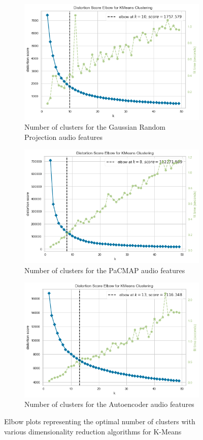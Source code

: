 \begin{figure}[!hbt]
\begin{subfigure}{.5\textwidth}
  \label{fig:sub-third}
\end{subfigure}
\begin{subfigure}{.5\textwidth}
  \centering
  \includegraphics[width=.6\linewidth]{Outputs/Elbow Plot - Gaussian Random Projections.png} 
  \captionsetup{justification=centering,margin=1cm}
  \caption{Number of clusters for the Gaussian Random Projection audio features}
  \label{fig:sub-fourth}
\end{subfigure}
\medskip
\begin{subfigure}{.5\textwidth}
  \centering
  \includegraphics[width=.6\linewidth]{Outputs/Elbow Plot - PaCMAP Features.png} 
  \captionsetup{justification=centering,margin=1cm}
  \caption{Number of clusters for the PaCMAP audio features}
  \label{fig:sub-fifth}
\end{subfigure}
\begin{subfigure}{.5\textwidth}
  \centering
  \includegraphics[width=.6\linewidth]{Outputs/Elbow Plot - Autoencoder Features.png}  
  \captionsetup{justification=centering,margin=1cm}
  \caption{Number of clusters for the Autoencoder audio features}
  \label{fig:sub-sixth}
\end{subfigure}
\caption{Elbow plots representing the optimal number of clusters with various dimensionality reduction algorithms for K-Means}
\label{fig:elbowplots}
\end{figure}
